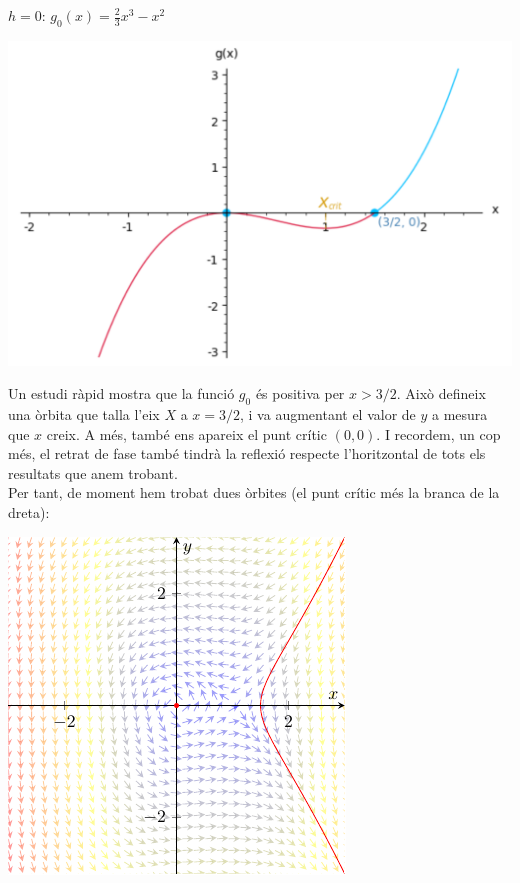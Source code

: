 \documentclass[10pt,a4paper]{article}
\begin{document}
\pagebreak
\underline{$h=0$}:\hspace{5cm} $\displaystyle g_0(x)=\frac{2}{3}x^3-x^2$
\begin{center}
  \begin{minipage}{\textwidth}
    \centering
    \includegraphics[scale=0.54]{Images/gh=0}
    \label{gh=0}
  \end{minipage}
\end{center}
Un estudi ràpid mostra que la funció $g_0$ és positiva per $x>3/2$. Això defineix una òrbita que talla l'eix $X$ a $x=3/2$, i va augmentant el valor de $y$ a mesura que $x$ creix. A més, també ens apareix el punt crític $(0,0)$. I recordem, un cop més, el retrat de fase també tindrà la reflexió respecte l'horitzontal de tots els resultats que anem trobant.
\\Per tant, de moment hem trobat dues òrbites (el punt crític més la branca de la dreta):
\begin{center}
  \begin{minipage}[h]{\textwidth}
    \centering
    \includegraphics[scale=1.5]{Images/retrat2h0}
    \label{retrat0}
  \end{minipage}\vspace{2mm}
\end{center}
\end{document}
